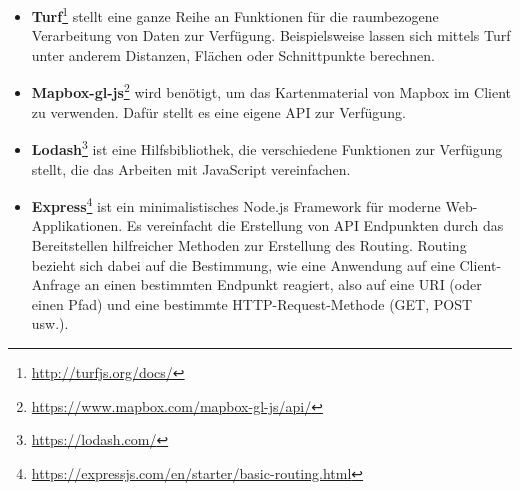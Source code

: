     \begin{itemize}[label={}]
      \item \textbf{Turf}\footnote{\url{http://turfjs.org/docs/}} stellt eine ganze Reihe an Funktionen für die raumbezogene Verarbeitung von Daten zur Verfügung. Beispielsweise lassen sich mittels Turf unter anderem Distanzen, Flächen oder Schnittpunkte berechnen.

      \item \textbf{Mapbox-gl-js}\footnote{\url{https://www.mapbox.com/mapbox-gl-js/api/}} wird benötigt, um das Kartenmaterial von Mapbox im Client zu verwenden. Dafür stellt es eine eigene API zur Verfügung.

      \item \textbf{Lodash}\footnote{\url{https://lodash.com/}} ist eine Hilfsbibliothek, die verschiedene Funktionen zur Verfügung stellt, die das Arbeiten mit JavaScript vereinfachen.

      \item \textbf{Express}\footnote{\url{https://expressjs.com/en/starter/basic-routing.html}} ist ein minimalistisches Node.js Framework für moderne Web-Applikationen. Es vereinfacht die Erstellung von API Endpunkten durch das Bereitstellen hilfreicher Methoden zur Erstellung des Routing. Routing bezieht sich dabei auf die Bestimmung, wie eine Anwendung auf eine Client-Anfrage an einen bestimmten Endpunkt reagiert, also auf eine URI (oder einen Pfad) und eine bestimmte HTTP-Request-Methode (GET, POST usw.).
    \end{itemize}
    
